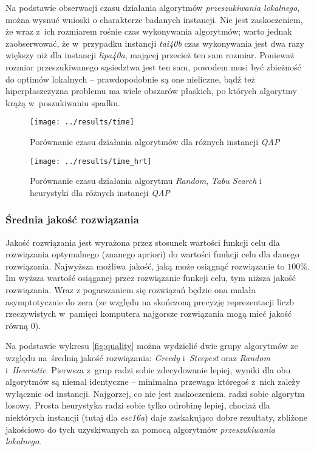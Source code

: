 \documentclass{article}
\begin{document}
			Na podstawie obserwacji czasu działania algorytmów \emph{przeszukiwania lokalnego}, można wysnuć wnioski o charakterze badanych instancji. Nie jest zaskoczeniem, że wraz z~ich rozmiarem rośnie czas wykonywania algorytmów; warto jednak zaobserwować, że w~przypadku instancji \emph{tai40b} czas wykonywania jest dwa razy większy niż dla instancji \emph{lipa40a}, mającej przecież ten sam rozmiar. Ponieważ rozmiar przeszukiwanego sąsiedztwa jest ten sam, powodem musi być zbieżność do optimów lokalnych -- prawdopodobnie są one nieliczne, bądź też hiperpłaszczyzna problemu ma wiele obszarów płaskich, po których algorytmy krążą w~poszukiwaniu spadku.

			\begin{figure}[h]
				\texttt{[image: ../results/time]}
				\caption{Porównanie czasu działania algorytmów dla różnych instancji \emph{QAP}\label{fig:time}}
			\end{figure}
			
			\begin{figure}[h]
				\texttt{[image: ../results/time\_hrt]}
				\caption{Porównanie czasu działania algorytmu \emph{Random}, \emph{Tabu Search} i heurystyki dla różnych instancji \emph{QAP}\label{fig:time_hr}}
			\end{figure}

		\subsubsection{Średnia jakość rozwiązania\label{ss:meanquality}}
Jakość rozwiązania jest wyrażona przez stosunek wartości funkcji celu dla rozwiązania optymalnego (znanego apriori) do wartości funkcji celu dla danego rozwiązania. Najwyższa możliwa jakość, jaką może osiągnąć rozwiązanie to $100\%$. Im wyższa wartość osiąganej przez rozwiązanie funkcji celu, tym niższa jakość rozwiązania. Wraz z pogarszaniem się rozwiązań będzie ona malała asymptotycznie do zera (ze względu na skończoną precyzję reprezentacji liczb rzeczywistych w~pamięci komputera najgorsze rozwiązania mogą mieć jakość równą 0).


			Na podstawie wykresu \ref{fig:quality} można wydzielić dwie grupy algorytmów ze względu na~średnią jakość rozwiązania: \emph{Greedy} i~\emph{Steepest} oraz \emph{Random} i~\emph{Heuristic}. Pierwsza z~grup radzi sobie zdecydowanie lepiej, wyniki dla obu algorytmów są niemal identyczne -- minimalna przewaga któregoś z~nich zależy wyłącznie od instancji. Najgorzej, co nie jest zaskoczeniem, radzi sobie algorytm losowy. Prosta heurystyka radzi sobie tylko odrobinę lepiej, chociaż dla niektórych instancji (tutaj dla \emph{esc16a}) daje zaskakująco dobre rezultaty, zbliżone jakościowo do tych uzyskiwanych za pomocą algorytmów \emph{przeszukiwania lokalnego}.
\end{document}
